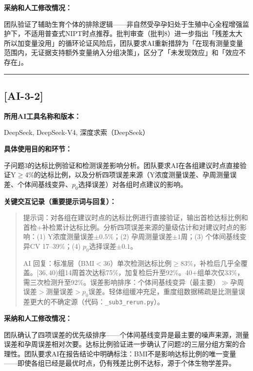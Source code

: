 \documentclass[12pt,a4paper]{ctexart}
\begin{document}
\textbf{采纳和人工修改情况：}

团队验证了辅助生育个体的排除逻辑——非自然受孕孕妇处于生殖中心全程增强监护下，不适用普查式NIPT时点推荐。批判审查（批判8）进一步指出「残差太大所以加变量没用」的循环论证风险后，团队要求AI重新措辞为「在现有测量变量范围内，无证据支持额外变量纳入分组决策」，区分了「未发现效应」和「效应不存在」。

\vspace{1em}
\hrule
\vspace{1em}

\subsection*{[AI-3-2]}

\textbf{所用AI工具名称和版本：}

DeepSeek, DeepSeek-V4, 深度求索（DeepSeek）

\textbf{具体使用目的和环节：}

子问题3的达标比例验证和检测误差影响分析。团队要求AI在各组建议时点直接验证Y$\geq$4\%的达标比例，以及分析四项误差来源（Y浓度测量误差、孕周测量误差、个体间基线变异、$p_0$选择误差）对各组时点建议的影响。

\textbf{关键交互记录（重要提示词与回复）：}

\begin{quote}
提示词：对各组在建议时点的达标比例进行直接验证，输出首检达标比例和首检+补检累计达标比例。分析四项误差来源的量级估计和对建议时点的影响：(1) Y浓度测量误差$\pm0.5\%$；(2) 孕周测量误差$\pm1$周；(3) 个体间基线变异CV 17--39\%；(4) $p_0$选择误差$\pm0.1$。

AI 回复：标准层（BMI$<36$）单次检测达标比例$\geq83\%$，补检后几乎全覆盖。[$36,40$)组14周首次达标75\%，加复检后升至92\%。40+组单次仅33\%，需三次检测升至92\%。误差影响排序：个体间基线变异（最主要）$\gg$孕周误差$>$测量误差$>p_0$误差。轻体组缓冲充足，重度组数据稀疏是比测量误差更大的不确定源（代码：\texttt{\_sub3\_rerun.py}）。
\end{quote}

\textbf{采纳和人工修改情况：}

团队确认了四项误差的优先级排序——个体间基线变异是最主要的噪声来源，测量误差和孕周误差相对次要。达标比例验证进一步确认了问题2的三层分组方案的合理性。团队要求AI在报告结论中明确标注：BMI不是影响达标比例的唯一变量——即使各组已经是最优时点，仍有残差比例不达标，源于个体生物学差异。

\end{document}
